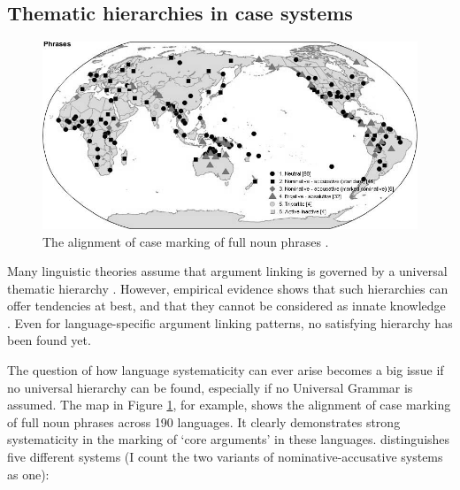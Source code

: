 \subsection{Thematic hierarchies in case systems}
\label{s:comp-thematic}

\begin{figure}[t]
\centerline{\includegraphics[width=\textwidth]{Chapter5/figs/wals.jpg}}
  \caption[Alignment of case marking of full noun phrases \citep{comrie05wals}]{The alignment of case marking of full noun phrases \citep[98]{comrie05wals}.}
   \label{f:wals}
\end{figure}

Many linguistic theories assume that argument linking is governed by a universal thematic hierarchy \citep[e.g.][]{dik97functional, fillmore68case, givon01syntax, jackendoff90semantic, keenan77noun}. However, empirical evidence shows that such hierarchies can offer tendencies at best, and that they cannot be considered as innate knowledge \citep{levin05argument}. Even for language-specific argument linking patterns, no satisfying hierarchy has been found yet.

The question of how language systematicity can ever arise becomes a big issue if no universal hierarchy can be found, especially if no Universal Grammar is assumed. The map in Figure \ref{f:wals}, for example, shows the alignment of case marking of full noun phrases across 190 languages. It clearly demonstrates strong systematicity in the marking of `core arguments' in these languages. \citet{comrie05wals} distinguishes five different systems (I count the two variants of nominative-accusative systems as one):

